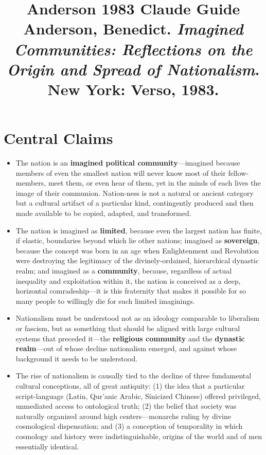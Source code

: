 \documentclass[12pt]{article}
\title{\textbf{Anderson 1983 Claude Guide}\\
\large Anderson, Benedict. \textit{Imagined Communities: Reflections on the Origin and Spread of Nationalism}.\\
New York: Verso, 1983.}
\author{}
\date{}
\begin{document}
\maketitle
\tableofcontents
\newpage

\section{Central Claims}

\begin{itemize}[leftmargin=*, itemsep=4pt]
    \item The nation is an \textbf{imagined political community}---imagined because members of even the smallest nation will never know most of their fellow-members, meet them, or even hear of them, yet in the minds of each lives the image of their communion. Nation-ness is not a natural or ancient category but a cultural artifact of a particular kind, contingently produced and then made available to be copied, adapted, and transformed.
    \item The nation is imagined as \textbf{limited}, because even the largest nation has finite, if elastic, boundaries beyond which lie other nations; imagined as \textbf{sovereign}, because the concept was born in an age when Enlightenment and Revolution were destroying the legitimacy of the divinely-ordained, hierarchical dynastic realm; and imagined as a \textbf{community}, because, regardless of actual inequality and exploitation within it, the nation is conceived as a deep, horizontal comradeship---it is this fraternity that makes it possible for so many people to willingly die for such limited imaginings.
    \item Nationalism must be understood not as an ideology comparable to liberalism or fascism, but as something that should be aligned with large cultural systems that preceded it---the \textbf{religious community} and the \textbf{dynastic realm}---out of whose decline nationalism emerged, and against whose background it needs to be understood.
    \item The rise of nationalism is causally tied to the decline of three fundamental cultural conceptions, all of great antiquity: (1) the idea that a particular script-language (Latin, Qur'anic Arabic, Sinicized Chinese) offered privileged, unmediated access to ontological truth; (2) the belief that society was naturally organized around high centers---monarchs ruling by divine cosmological dispensation; and (3) a conception of temporality in which cosmology and history were indistinguishable, origins of the world and of men essentially identical.

\end{itemize}
\end{document}
